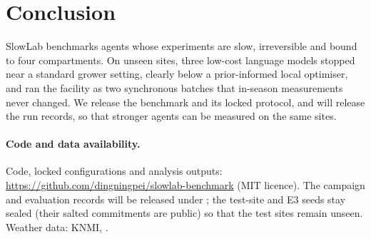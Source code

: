 \section{Conclusion}
\label{sec:conclusion}
SlowLab benchmarks agents whose experiments are slow, irreversible and bound to four compartments. On  unseen sites, three low-cost language models stopped near a standard grower setting, clearly below a prior-informed local optimiser, and ran the facility as two synchronous batches that in-season measurements never changed. We release the benchmark and its locked protocol, and will release the run records, so that stronger agents can be measured on the same sites.

\paragraph{Code and data availability.} Code, locked configurations and analysis outputs: \url{https://github.com/dingningpei/slowlab-benchmark} (MIT licence). The campaign and evaluation records will be released under \ccby{}; the test-site and E3 seeds stay sealed (their salted commitments are public) so that the test sites remain unseen. Weather data: KNMI, \ccby{} \citep{knmi_cabauw,knmi_cabauw_rad}.
